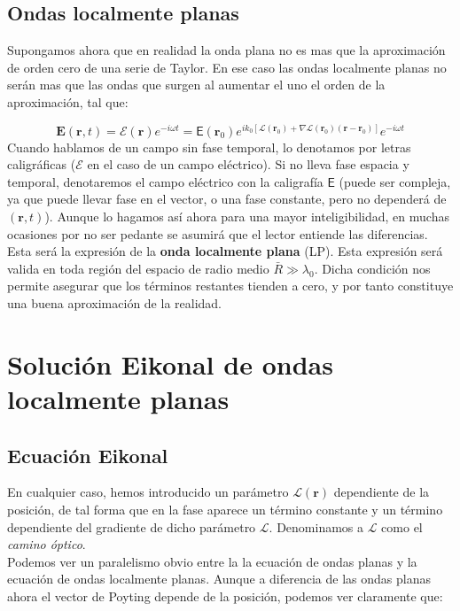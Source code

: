 \documentclass[12pt,a4paper]{book}
\numberwithin{equation}{section}
\numberwithin{figure}{section}
\newcommand{\1}{_{(1)}}
\newcommand{\2}{_{(2)}}
\newcommand{\rn}{\mathbf{r}}
\newcommand{\En}{\mathbf{E}}
\newcommand{\Encal}{\boldsymbol{\mathcal{E}}}
\theoremstyle{definition}
\begin{document}
\subsection{Ondas localmente planas}

 Supongamos ahora que en realidad la onda plana no es mas que la aproximación de orden cero de una serie de Taylor. En ese caso las ondas localmente planas no serán mas que las ondas que surgen al aumentar el uno el orden de la aproximación, tal que:
 
\begin{equation}
\En (\rn,t) = \Encal (\rn) e^{-i \omega t} = \mathsf{E} (\rn_0) e^{ik_0[\mathcal{L} (\rn_0) + \nabla \mathcal{L} (\rn_0) (\rn - \rn_0)]} e^{- i \omega t}
\end{equation}
Cuando hablamos de un campo sin fase temporal, lo denotamos por letras caligráficas ($\mathcal{E}$ en el caso de un campo eléctrico). Si no lleva fase espacia y temporal, denotaremos el campo eléctrico con la caligrafía $\mathsf{E}$ (puede ser compleja, ya que puede llevar fase en el vector, o una fase constante, pero no dependerá de $(\rn,t)$). Aunque lo hagamos así ahora para una mayor inteligibilidad, en muchas ocasiones por no ser pedante se asumirá que el lector entiende las diferencias. Esta será la expresión de la \textbf{onda localmente plana} (LP). Esta expresión será valida en toda región del espacio de radio medio $\bar{R} \gg \lambda_0$. Dicha condición nos permite asegurar que los términos restantes tienden a cero, y por tanto constituye una buena aproximación de la realidad.

\section{Solución Eikonal de ondas localmente planas}

\subsection{Ecuación Eikonal}

En cualquier caso, hemos introducido un parámetro $\mathcal{L} (\rn)$ dependiente de la posición, de tal forma que en la fase aparece un término constante y un término dependiente del gradiente de dicho parámetro $\mathcal{L}$. Denominamos a $\mathcal{L}$ como el \textit{camino óptico}. \\

Podemos ver un paralelismo obvio entre la la ecuación de ondas planas y la ecuación de ondas localmente planas. Aunque a diferencia de las ondas planas ahora el vector de Poyting depende de la posición, podemos ver claramente que:
\end{document}
